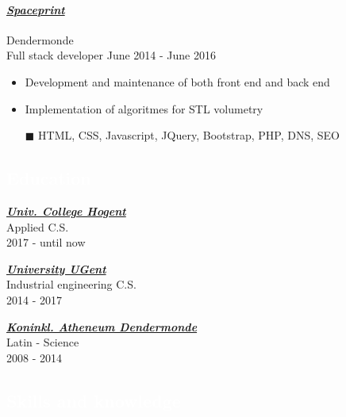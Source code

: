 \documentclass[a4paper, twoside]{article}
\begin{document}
\paragraph{\textbf{\textit{\href{https:// }{\textcolor{blueDark}{ Spaceprint }}}}} \hfill\small Dendermonde \\
Full stack developer \hfill\small
June 2014
- June 2016
\begin{itemize}
\itemsep-0.2em
\item Development and maintenance of both front end and back end
\item Implementation of algoritmes for STL volumetry
\item[\color{orange}$\blacksquare$] HTML, CSS, Javascript, JQuery, Bootstrap, PHP, DNS, SEO
\end{itemize}
\begin{mdframed}
\section*{\textcolor{white}{ Education }}
\end{mdframed}
\begin{multicols}{ 3 }
\setlength{\parindent}{0pt}
\par
\textbf{\textit{\href{https://hogent.be }{\textcolor{blueDark}{ Univ. College Hogent }}}}\\
Applied C.S.\\ \small 2017 - until now
\setlength{\parindent}{0pt}
\par
\textbf{\textit{\href{https://ugent.be }{\textcolor{blueDark}{ University UGent }}}}\\
Industrial engineering C.S.\\ \small 2014 - 2017
\setlength{\parindent}{0pt}
\par
\textbf{\textit{\href{https://kad.be }{\textcolor{blueDark}{ Koninkl. Atheneum Dendermonde }}}}\\
Latin - Science\\ \small 2008 - 2014
\end{multicols}
\begin{mdframed}
\section*{\textcolor{white}{ Skills and knowledge }}
\end{mdframed}
\noindent
\end{document}
